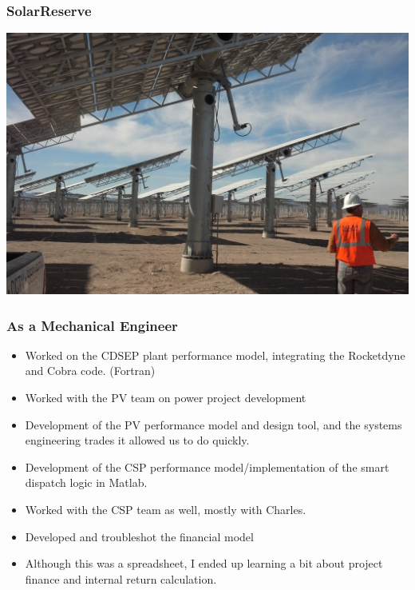 \documentclass[aspectratio=169]{beamer}
\begin{document}
\begin{frame}
  \frametitle{SolarReserve}
  \center
  \includegraphics[width=.7\linewidth]{HeliostatImage.jpg}
\end{frame}

\begin{frame}
  \frametitle{As a Mechanical Engineer}
  \begin{itemize}
  \item Worked on the CDSEP plant performance model, integrating the Rocketdyne and Cobra code. (Fortran)
  \item Worked with the PV team on power project development
  \item Development of the PV performance model and design tool, and the systems engineering trades it allowed us to do quickly.
  \item Development of the CSP performance model/implementation of the smart dispatch logic in Matlab.
  \item Worked with the CSP team as well, mostly with Charles.
  \item Developed and troubleshot the financial model
  \item Although this was a spreadsheet, I ended up learning a bit about project finance and internal return calculation.
  \end{itemize}
\end{frame}
\end{document}
